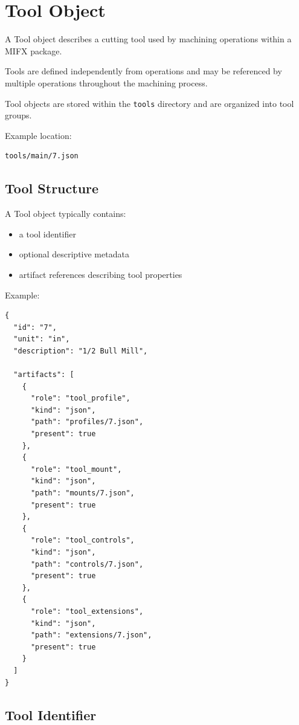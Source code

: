 \section{Tool Object}

A Tool object describes a cutting tool used by machining operations within a MIFX package.

Tools are defined independently from operations and may be referenced by multiple operations throughout the machining process.

Tool objects are stored within the \texttt{tools} directory and are organized into tool groups.

Example location:

\begin{verbatim}
tools/main/7.json
\end{verbatim}

\subsection{Tool Structure}

A Tool object typically contains:

\begin{itemize}
\item a tool identifier
\item optional descriptive metadata
\item artifact references describing tool properties
\end{itemize}

Example:

\begin{verbatim}
{
  "id": "7",
  "unit": "in",
  "description": "1/2 Bull Mill",

  "artifacts": [
    {
      "role": "tool_profile",
      "kind": "json",
      "path": "profiles/7.json",
      "present": true
    },
    {
      "role": "tool_mount",
      "kind": "json",
      "path": "mounts/7.json",
      "present": true
    },
    {
      "role": "tool_controls",
      "kind": "json",
      "path": "controls/7.json",
      "present": true
    },
    {
      "role": "tool_extensions",
      "kind": "json",
      "path": "extensions/7.json",
      "present": true
    }
  ]
}
\end{verbatim}

\subsection{Tool Identifier}

